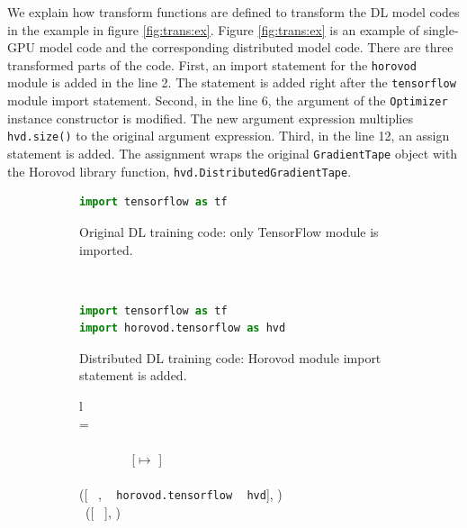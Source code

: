 We explain how transform functions are defined to transform the DL model codes
in the example in figure \ref{fig:trans:ex}.
Figure \ref{fig:trans:ex} is an example of single-GPU model code and
the corresponding distributed model code.
There are three transformed parts of the code. 
First, an import statement for the {\tt horovod} module is added in the line 2. 
The statement is added right after the {\tt tensorflow} module import statement.
Second, in the line 6, the argument of the {\tt Optimizer} instance constructor
is modified. The new argument expression multiplies {\tt hvd.size()} 
to the original argument expression.
Third, in the line 12, an assign statement is added. 
The assignment wraps the original {\tt GradientTape} object with
the Horovod library function, {\tt hvd.DistributedGradientTape}.

\begin{figure}[ht!]
    \centering
    \begin{subfigure}[b]{0.48\textwidth}
        \begin{lstlisting}[language=Python]
import tensorflow as tf\end{lstlisting}
        \caption{Original DL training code: only TensorFlow module is imported.}
        \label{fig:trans:ex01:org}
    \end{subfigure}
    ~
    \begin{subfigure}[b]{0.48\textwidth}
        \begin{lstlisting}[language=Python]
import tensorflow as tf
import horovod.tensorflow as hvd\end{lstlisting}
        \caption{Distributed DL training code: Horovod module import statement is added.}
        \label{fig:trans:ex01:hvd}
    \end{subfigure}
    \begin{subfigure}[t]{\textwidth}
        \centering
        \begin{tabular}{l}
            \\
            \tstmt{\kimport ~ \mul{\nalias}}{\smodenv} = \\
            \inden \ktlet ~  ~ \kteq ~ \taalias{\mul{\nalias}}{\smodenv} \ktin \\
            \inden \ktif ~  ~ \envsub ~ \smodenv ~ \kteq ~ [\tflow $\mapsto$ \nid]\\ 
            \inden\ktthen \\
            \inden\hspace{1em} ([\kimport ~ \mul{\nalias},
            \kimport ~ {\tt horovod.tensorflow} \kas ~ {\tt hvd}], )\\
            \inden \ktelse~([\kimport ~ \mul{\nalias}], )
\end{tabular}\\\vpar


\end{subfigure}
\end{figure}
